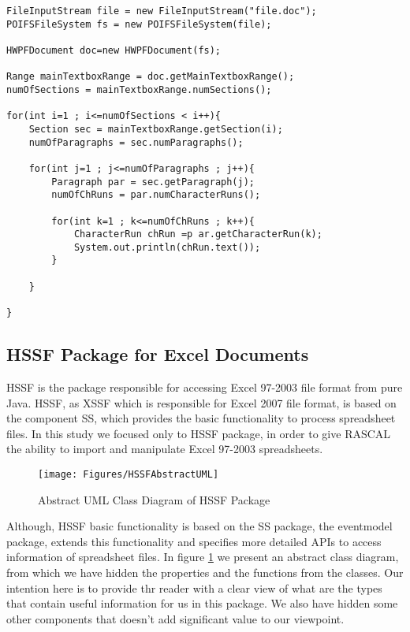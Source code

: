 \begin{lstlisting}[caption={Example on how to use Ranges and iterate through them to print all the text of a document in HWPF package},label={lst:HwpfLst}]
FileInputStream file = new FileInputStream("file.doc");
POIFSFileSystem fs = new POIFSFileSystem(file);

HWPFDocument doc=new HWPFDocument(fs);

Range mainTextboxRange = doc.getMainTextboxRange();
numOfSections = mainTextboxRange.numSections();

for(int i=1 ; i<=numOfSections < i++){
	Section sec = mainTextboxRange.getSection(i);
	numOfParagraphs = sec.numParagraphs();

	for(int j=1 ; j<=numOfParagraphs ; j++){
		Paragraph par = sec.getParagraph(j);
		numOfChRuns = par.numCharacterRuns();

		for(int k=1 ; k<=numOfChRuns ; k++){
			CharacterRun chRun =p ar.getCharacterRun(k);
			System.out.println(chRun.text());
		}
				
	}

}

\end{lstlisting}


\subsection{HSSF Package for Excel Documents}

HSSF is the package responsible for accessing Excel 97-2003 file format from pure Java. HSSF, as XSSF which is responsible for Excel 2007 file format, is based on the component SS, which provides the basic functionality to process spreadsheet files. In this study we focused only to HSSF package, in order to give RASCAL the ability to import and manipulate Excel 97-2003 spreadsheets.

\begin{figure}[center]
\texttt{[image: Figures/HSSFAbstractUML]}
\caption{Abstract UML Class Diagram of HSSF Package}
\label{fig:HSSFUML}
\end{figure}

Although, HSSF basic functionality is based on the SS package, the eventmodel package, extends this functionality and specifies more detailed APIs to access information of spreadsheet files. In figure \ref{fig:HSSFUML} we present an abstract class diagram, from which we have hidden the properties and the functions from the classes. Our intention here is to provide thr reader with a clear view of what are the types that contain useful information for us in this package. We also have hidden some other components that doesn't add significant value to our viewpoint.

